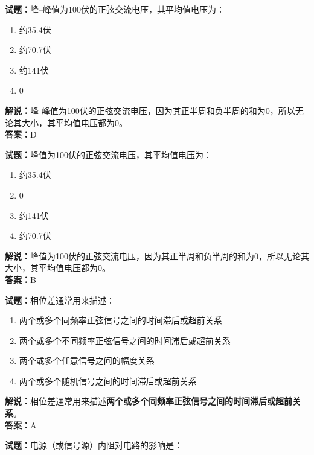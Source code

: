 \documentclass{ctexbook}
\begin{document}
\bigskip

\noindent\textbf{试题：}峰--峰值为\num{100}伏的正弦交流电压，其平均值电压为：
\begin{enumerate}[leftmargin=3em]
  \item 约\num{35.4}伏
  \item 约\num{70.7}伏
  \item 约\num{141}伏
  \item \num{0}
\end{enumerate}

\noindent\textbf{解说：}峰-峰值为\num{100}伏的正弦交流电压，因为其正半周和负半周的和为\num{0}，所以无论其大小，其平均值电压都为\num{0}。\\
\noindent\textbf{答案：}D

\bigskip

\noindent\textbf{试题：}峰值为\num{100}伏的正弦交流电压，其平均值电压为：

\begin{enumerate}[leftmargin=3em]
  \item 约\num{35.4}伏
  \item \num{0}
  \item 约\num{141}伏
  \item 约\num{70.7}伏
\end{enumerate}

\noindent\textbf{解说：}峰值为\num{100}伏的正弦交流电压，因为其正半周和负半周的和为\num{0}，所以无论其大小，其平均值电压都为\num{0}。\\
\noindent\textbf{答案：}B

\bigskip

\noindent\textbf{试题：}相位差通常用来描述：

\begin{enumerate}[leftmargin=3em]
  \item 两个或多个同频率正弦信号之间的时间滞后或超前关系
  \item 两个或多个不同频率正弦信号之间的时间滞后或超前关系
  \item 两个或多个任意信号之间的幅度关系
  \item 两个或多个随机信号之间的时间滞后或超前关系
\end{enumerate}

\noindent\textbf{解说：}相位差通常用来描述\textbf{两个或多个同频率正弦信号之间的时间滞后或超前关系}。\\\noindent\textbf{答案：}A

\bigskip

\noindent\textbf{试题：}电源（或信号源）内阻对电路的影响是：
\end{document}
